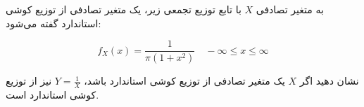 \problem{}
به متغیر تصادفی \( X \) با تابع توزیع تجمعی زیر، یک متغیر تصادفی از
 توزیع کوشی استاندارد گفته می‌شود:

\[
f_X(x) = \dfrac{1}{\pi (1 + x^2)} \quad -\infty \leq x \leq \infty
\]

نشان دهید اگر \( X \) یک متغیر تصادفی از توزیع کوشی 
استاندارد باشد، \( Y = \frac{1}{X} \) نیز از توزیع کوشی استاندارد است.
